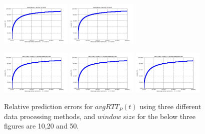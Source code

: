 \documentclass[sigconf]{acmart}
\begin{document}
\begin{figure} [!htb] 
	\centering  
	\includegraphics[width=0.3\textwidth]{fig4/data-1-task-3-7030-RF.jpg}  
	\includegraphics[width=0.3\textwidth]{fig4/data-2-task-3-7030-RF.jpg} 
\end{figure} 
\begin{figure} 	
	\includegraphics[width=0.3\textwidth]{fig4/data-3-task-3-7030-windowsize10-RF.jpg} 
	\includegraphics[width=0.3\textwidth]{fig4/data-3-task-3-7030-windowsize20-RF.jpg}
	\includegraphics[width=0.3\textwidth]{fig4/data-3-task-3-7030-windowsize50-RF.jpg}
	\caption{Relative prediction errors for $avgRTT_P(t)$ using three different data processing methods, and $window\ size$ for the below three figures are 10,20 and 50.}
	\label{fig:task3_RF}
\end{figure}
\end{document}
